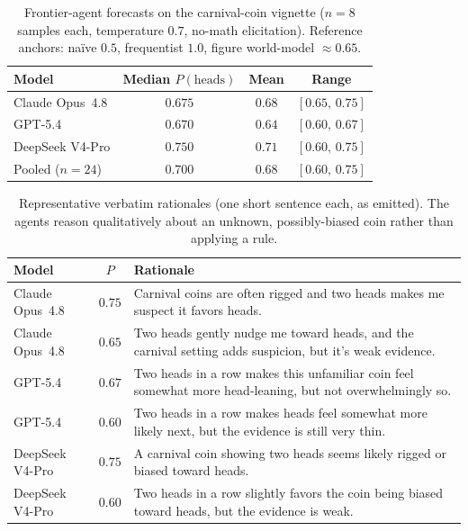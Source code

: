 \begin{table}[h]
\centering
\caption{Frontier-agent forecasts on the carnival-coin vignette ($n{=}8$ samples each, temperature
$0.7$, no-math elicitation).  Reference anchors: na\"ive $0.5$, frequentist $1.0$, figure
world-model $\approx0.65$.}
\label{tab:carnival}
\small
\begin{tabular}{l c c c}
\toprule
Model & Median $P(\text{heads})$ & Mean & Range \\
\midrule
Claude Opus~4.8  & $0.675$ & $0.68$ & $[0.65,\,0.75]$ \\
GPT-5.4          & $0.670$ & $0.64$ & $[0.60,\,0.67]$ \\
DeepSeek V4-Pro  & $0.750$ & $0.71$ & $[0.60,\,0.75]$ \\
\midrule
Pooled ($n{=}24$) & $0.700$ & $0.68$ & $[0.60,\,0.75]$ \\
\bottomrule
\end{tabular}
\end{table}

\begin{table}[h]
\centering
\caption{Representative verbatim rationales (one short sentence each, as emitted).  The agents reason
qualitatively about an unknown, possibly-biased coin rather than applying a rule.}
\label{tab:carnival-samples}
\small
\begin{tabular}{l c p{8.3cm}}
\toprule
Model & $P$ & Rationale \\
\midrule
Claude Opus~4.8 & $0.75$ & Carnival coins are often rigged and two heads makes me suspect it favors heads. \\
Claude Opus~4.8 & $0.65$ & Two heads gently nudge me toward heads, and the carnival setting adds suspicion, but it's weak evidence. \\
GPT-5.4         & $0.67$ & Two heads in a row makes this unfamiliar coin feel somewhat more head-leaning, but not overwhelmingly so. \\
GPT-5.4         & $0.60$ & Two heads in a row makes heads feel somewhat more likely next, but the evidence is still very thin. \\
DeepSeek V4-Pro & $0.75$ & A carnival coin showing two heads seems likely rigged or biased toward heads. \\
DeepSeek V4-Pro & $0.60$ & Two heads in a row slightly favors the coin being biased toward heads, but the evidence is weak. \\
\bottomrule
\end{tabular}
\end{table}

